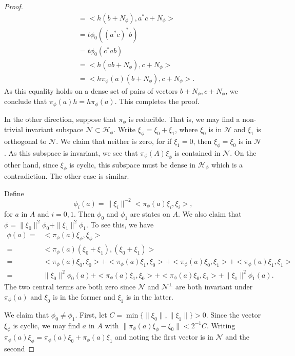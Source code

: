 \documentclass{book}
\begin{document}
\begin{proof}
\begin{align*}
    &= <h(b+N_\phi),a^*c+N_\phi >\\
    &= t\phi_0({(a^*c)}^*b)\\
    &= t\phi_0(c^*ab)\\
    &= <h(ab+N_\phi),c+N_\phi >\\
    &= <h\pi_\phi(a)(b+N_\phi),c+N_\phi > .
  \end{align*}
  As this equality holds on a dense set of pairs of vectors \(b + N_\phi,c + N_\phi\), we
  conclude that \(\pi_\phi(a)h = h\pi_\phi(a)\). This completes the proof.\par
  In the other direction, suppose that \(\pi_\phi\) is reducible. That is, we may find
  a non-trivial invariant subspace \(\mathcal{N} \subset \mathcal{H}_\phi\). Write \(\xi_\phi = \xi_0 + \xi_1\), where \(\xi_0\) is in
  \(\mathcal{N}\) and \(\xi_1\) is orthogonal to \(\mathcal{N}\). We claim that neither is zero, for if \(\xi_1 = 0\),
  then \(\xi_\phi = \xi_0\) is in \(\mathcal{N}\). As this subspace is invariant, we see that \(\pi_\phi(A)\xi_\phi\) is
  contained in \(\mathcal{N}\). On the other hand, since \(\xi_\phi\) is cyclic, this subspace must be
  dense in \(\mathcal{H}_\phi\) which is a contradiction. The other case is similar.\par
  Define
  \[\phi_i(a) = \|\xi_i\|^{-2} < \pi_\phi(a)\xi_i,\xi_i >,\]
  for \(a\) in \(A\) and \(i = 0,1\). Then \(\phi_0\) and \(\phi_1\) are states on \(A\). We also claim that
  \(\phi = \|\xi_0\|^2\phi_0+\|\xi_1\|^2\phi_1\). To see this, we have
  \begin{align*}
    \phi(a) =& <\pi_\phi(a)\xi_\phi,\xi_\phi >\\
    =& <\pi_\phi(a)(\xi_0 +\xi_1),(\xi_0 +\xi_1) >\\
    =& <\pi_\phi(a)\xi_0,\xi_0 > + < \pi_\phi(a)\xi_1,\xi_0 >+<\pi_\phi(a)\xi_0,\xi_1 > + < \pi_\phi(a)\xi_1,\xi_1 >\\
    =& \|\xi_0\|^2\phi_0(a)+ <\pi_\phi(a)\xi_1,\xi_0 >+<\pi_\phi(a)\xi_0,\xi_1 > +\|\xi_1\|^2\phi_1(a).
  \end{align*}
  The two central terms are both zero since \(\mathcal{N}\) and \(\mathcal{N}^\perp \) are both invariant
  under \(\pi_\phi(a)\) and \(\xi_0\) is in the former and \(\xi_1\) is in the latter.\par
  We claim that \(\phi_0\neq \phi_1\). First, let \(C = \min\{ \|\xi_0\| , \|\xi_1\| \} > 0\). Since the
  vector \(\xi_\phi\) is cyclic, we may find \(a\) in \(A\) with \(\|\pi_\phi(a)\xi_\phi -\xi_0\| < 2^{-1}C\). Writing
  \(\pi_\phi(a)\xi_\phi = \pi_\phi(a)\xi_0+\pi_\phi(a)\xi_1\) and noting the first vector is in \(\mathcal{N}\) and the second

\end{proof}
\end{document}
